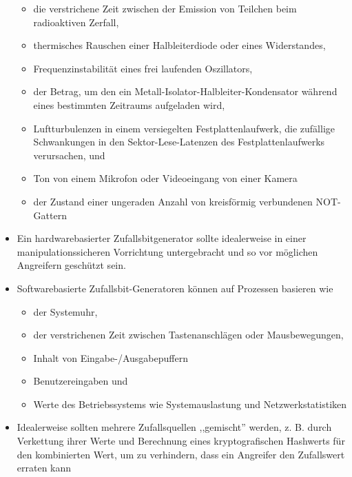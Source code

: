 \documentclass[a4paper]{article}
\begin{document}
\begin{multicols}{3}
\begin{itemize}
              \begin{itemize}
                  \item
                        die verstrichene Zeit zwischen der Emission von Teilchen beim
                        radioaktiven Zerfall,
                  \item
                        thermisches Rauschen einer Halbleiterdiode oder eines Widerstandes,
                  \item
                        Frequenzinstabilität eines frei laufenden Oszillators,
                  \item
                        der Betrag, um den ein Metall-Isolator-Halbleiter-Kondensator
                        während eines bestimmten Zeitraums aufgeladen wird,
                  \item
                        Luftturbulenzen in einem versiegelten Festplattenlaufwerk, die
                        zufällige Schwankungen in den Sektor-Lese-Latenzen des
                        Festplattenlaufwerks verursachen, und
                  \item
                        Ton von einem Mikrofon oder Videoeingang von einer Kamera
                  \item
                        der Zustand einer ungeraden Anzahl von kreisförmig verbundenen
                        NOT-Gattern
              \end{itemize}
        \item
              Ein hardwarebasierter Zufallsbitgenerator sollte idealerweise in einer
              manipulationssicheren Vorrichtung untergebracht und so vor möglichen
              Angreifern geschützt sein.
        \item
              Softwarebasierte Zufallsbit-Generatoren können auf Prozessen basieren
              wie

              \begin{itemize}
                  \item
                        der Systemuhr,
                  \item
                        der verstrichenen Zeit zwischen Tastenanschlägen oder
                        Mausbewegungen,
                  \item
                        Inhalt von Eingabe-/Ausgabepuffern
                  \item
                        Benutzereingaben und
                  \item
                        Werte des Betriebssystems wie Systemauslastung und
                        Netzwerkstatistiken
              \end{itemize}
        \item
              Idealerweise sollten mehrere Zufallsquellen ,,gemischt'' werden, z. B.
              durch Verkettung ihrer Werte und Berechnung eines kryptografischen
              Hashwerts für den kombinierten Wert, um zu verhindern, dass ein
              Angreifer den Zufallswert erraten kann


\end{itemize}
\end{multicols}
\end{document}
